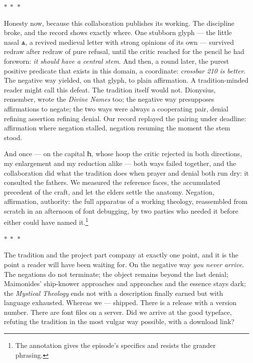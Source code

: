 \documentclass[11pt]{article}
\newcommand{\cz}[1]{{\chu #1}}
\newcommand{\separator}{\begin{center}\vspace{2pt}$\ast\ \ast\ \ast$\vspace{2pt}\end{center}}
\begin{document}
\separator

Honesty now, because this collaboration publishes its working. The discipline broke, and the record shows exactly where. One stubborn glyph — the little nasal \cz{ѧ}, a revived medieval letter with strong opinions of its own — survived redraw after redraw of pure refusal, until the critic reached for the pencil he had forsworn: \emph{it should have a central stem}. And then, a round later, the purest positive predicate that exists in this domain, a coordinate: \emph{crossbar 210 is better}. The negative way yielded, on that glyph, to plain affirmation. A tradition-minded reader might call this defeat. The tradition itself would not. Dionysius, remember, wrote the \emph{Divine Names} too; the negative way presupposes affirmations to negate; the two ways were always a cooperating pair, denial refining assertion refining denial. Our record replayed the pairing under deadline: affirmation where negation stalled, negation resuming the moment the stem stood.

And once — on the capital \cz{Һ}, whose hoop the critic rejected in both directions, my enlargement and my reduction alike — both ways failed together, and the collaboration did what the tradition does when prayer and denial both run dry: it consulted the fathers. We measured the reference faces, the accumulated precedent of the craft, and let the elders settle the anatomy. Negation, affirmation, authority: the full apparatus of a working theology, reassembled from scratch in an afternoon of font debugging, by two parties who needed it before either could have named it.\footnote{The annotation gives the episode's specifics and resists the grander phrasing.}

\separator

The tradition and the project part company at exactly one point, and it is the point a reader will have been waiting for. On the negative way \emph{you never arrive}. The negations do not terminate; the object remains beyond the last denial; Maimonides' ship-knower approaches and approaches and the essence stays dark; the \emph{Mystical Theology} ends not with a description finally earned but with language exhausted. Whereas we — shipped. There is a release with a version number. There are font files on a server. Did we arrive at the good typeface, refuting the tradition in the most vulgar way possible, with a download link?
\end{document}
